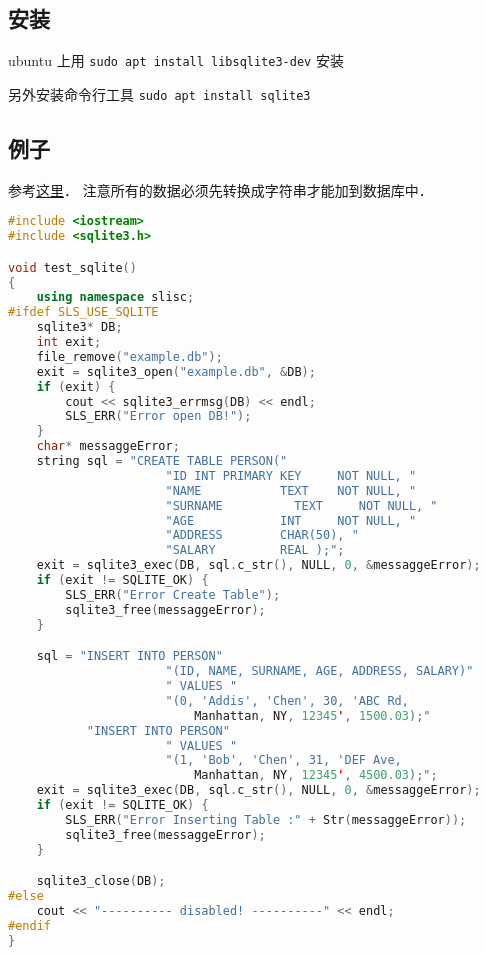 
\begin{issues}
\issueDraft
\end{issues}


\subsection{安装}
ubuntu 上用 \verb|sudo apt install libsqlite3-dev| 安装

另外安装命令行工具 \verb|sudo apt install sqlite3|

\subsection{例子}
参考\href{https://www.tutorialspoint.com/sqlite/sqlite_c_cpp.htm}{这里}． 注意所有的数据必须先转换成字符串才能加到数据库中．
\begin{lstlisting}[language=cpp]
#include <iostream>
#include <sqlite3.h>

void test_sqlite()
{
	using namespace slisc;
#ifdef SLS_USE_SQLITE
	sqlite3* DB;
	int exit;
	file_remove("example.db");
	exit = sqlite3_open("example.db", &DB);
	if (exit) {
		cout << sqlite3_errmsg(DB) << endl;
		SLS_ERR("Error open DB!");
	}
	char* messaggeError;
	string sql = "CREATE TABLE PERSON("
					  "ID INT PRIMARY KEY     NOT NULL, "
					  "NAME           TEXT    NOT NULL, "
					  "SURNAME          TEXT     NOT NULL, "
					  "AGE            INT     NOT NULL, "
					  "ADDRESS        CHAR(50), "
					  "SALARY         REAL );";
	exit = sqlite3_exec(DB, sql.c_str(), NULL, 0, &messaggeError);
	if (exit != SQLITE_OK) {
		SLS_ERR("Error Create Table");
		sqlite3_free(messaggeError);
	}

	sql = "INSERT INTO PERSON"
					  "(ID, NAME, SURNAME, AGE, ADDRESS, SALARY)"
					  " VALUES "
					  "(0, 'Addis', 'Chen', 30, 'ABC Rd,
                          Manhattan, NY, 12345', 1500.03);"
		   "INSERT INTO PERSON"
					  " VALUES "
					  "(1, 'Bob', 'Chen', 31, 'DEF Ave,
                          Manhattan, NY, 12345', 4500.03);";
	exit = sqlite3_exec(DB, sql.c_str(), NULL, 0, &messaggeError);
	if (exit != SQLITE_OK) {
		SLS_ERR("Error Inserting Table :" + Str(messaggeError));
		sqlite3_free(messaggeError);
	}

	sqlite3_close(DB);
#else
	cout << "---------- disabled! ----------" << endl;
#endif
}
\end{lstlisting}


